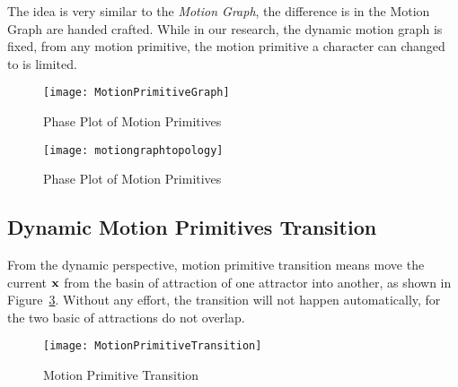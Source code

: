 The idea is very similar to the \emph{Motion Graph}\citep{kovar2008motion}, the difference is in the  Motion Graph are handed crafted.
While in our research,  the dynamic motion graph is fixed, from any motion primitive, the motion primitive a character can changed to is limited.

\begin{figure}[!htbp]
  \begin{center}
	\texttt{[image: MotionPrimitiveGraph]}
    \caption{Phase Plot of Motion Primitives}
    \label{fig:manyprimitives}
  \end{center}
\end{figure}


\begin{figure}[!htbp]
  \begin{center}
      \texttt{[image: motiongraphtopology]}
    \caption{Phase Plot of Motion Primitives}
    \label{fig:manyprimitives}
  \end{center}
\end{figure}


\subsection{Dynamic Motion Primitives Transition}
From  the dynamic perspective, motion primitive transition means move the current $\mathbf{x}$ from the basin of attraction of one attractor into another, as shown in Figure~\ref{fig:motion-transition}.
Without any effort, the transition will not happen automatically, for the two basic of attractions do not overlap.



\begin{figure}[!htbp]
  \begin{center}
      \texttt{[image: MotionPrimitiveTransition]}
    \caption{Motion Primitive Transition}
    \label{fig:motion-transition}
  \end{center}
\end{figure}


